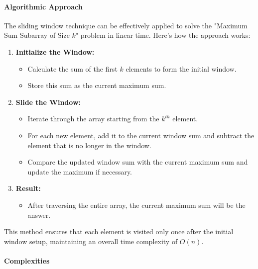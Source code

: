 \paragraph*{Algorithmic Approach}

The sliding window technique can be effectively applied to solve the "Maximum Sum Subarray of Size \(k\)" problem in linear time. Here's how the approach works:

\begin{enumerate}
    \item \textbf{Initialize the Window:}
    \begin{itemize}
        \item Calculate the sum of the first \(k\) elements to form the initial window.
        \item Store this sum as the current maximum sum.
    \end{itemize}
    
    \item \textbf{Slide the Window:}
    \begin{itemize}
        \item Iterate through the array starting from the \(k^{th}\) element.
        \item For each new element, add it to the current window sum and subtract the element that is no longer in the window.
        \item Compare the updated window sum with the current maximum sum and update the maximum if necessary.
    \end{itemize}
    
    \item \textbf{Result:}
    \begin{itemize}
        \item After traversing the entire array, the current maximum sum will be the answer.
    \end{itemize}
\end{enumerate}

This method ensures that each element is visited only once after the initial window setup, maintaining an overall time complexity of \(O(n)\).

\paragraph*{Complexities}

